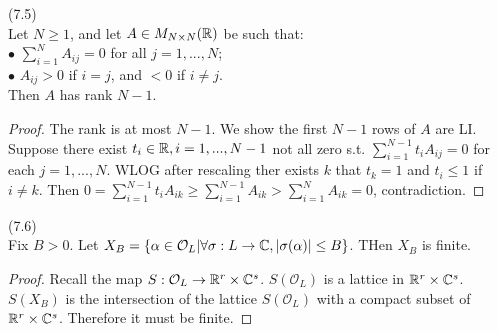 \documentclass[a4paper]{article}
\begin{document}
\begin{lemma} (7.5)\\
Let $N \geq 1$, and let $A \in M_{N \times N} (\mathbb{R})$ be such that:\\
$\bullet$ $\sum_{i=1}^N A_{ij} = 0$ for all $j=1,...,N$;\\
$\bullet$ $A_{ij} > 0$ if $i = j$, and $<0$ if $i \neq j$.\\
Then $A$ has rank $N-1$.
\begin{proof}
The rank is at most $N-1$. We show the first $N-1$ rows of $A$ are LI.\\
Suppose there exist $t_i \in \mathbb{R},i = 1,...,N-1$ not all zero s.t. $\sum_{i=1}^{N-1} t_i A_{ij} = 0$ for each $j = 1,...,N$. WLOG after rescaling ther exists $k$ that $t_k=1$ and $t_i \leq 1$ if $i \neq k$. Then $0 = \sum_{i=1}^{N-1} t_i A_{ik} \geq \sum_{i=1}^{N-1} A_{ik} > \sum_{i=1}^N A_{ik} = 0$, contradiction.
\end{proof}
\end{lemma}

\begin{lemma} (7.6)\\
Fix $B>0$. Let $X_B = \{\alpha \in \mathcal{O}_L | \forall \sigma: L \to \mathbb{C}, |\sigma(\alpha)| \leq B\}$. THen $X_B$ is finite.
\begin{proof}
Recall the map $S:\mathcal{O}_L \to \mathbb{R}^r \times \mathbb{C}^s$. $S(\mathcal{O}_L)$ is a lattice in $\mathbb{R}^r \times \mathbb{C}^s$. $S(X_B)$ is the intersection of the lattice $S(\mathcal{O}_L)$ with a compact subset of $\mathbb{R}^r \times \mathbb{C}^s$. Therefore it must be finite.
\end{proof}
\end{lemma}
\end{document}
